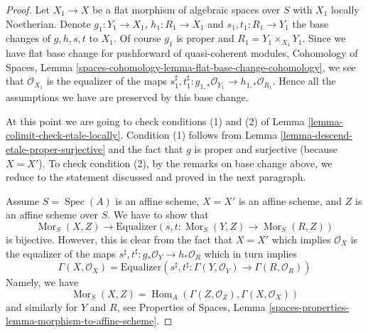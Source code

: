 \documentclass[10pt,a4paper]{amsart}
\theoremstyle{plain}
\theoremstyle{definition}
\theoremstyle{remark}
\numberwithin{equation}{subsection}
\def\Spec{\mathop{\mathrm{Spec}}}
\def\Hom{\mathop{\mathrm{Hom}}\nolimits}
\def\Mor{\mathop{\mathrm{Mor}}\nolimits}
\begin{document}
\begin{proof}
\medskip\noindent
Let $X_1 \to X$ be a flat morphism of algebraic spaces over $S$ with $X_1$
locally Noetherian. Denote $g_1 : Y_1 \to X_1$, $h_1 : R_1 \to X_1$ and
$s_1, t_1 : R_1 \to Y_1$ the base changes of $g, h, s, t$ to $X_1$.
Of course $g_1$ is proper and $R_1 = Y_1 \times_{X_1} Y_1$.
Since we have flat base change for pushforward of quasi-coherent modules,
Cohomology of Spaces, Lemma
\ref{spaces-cohomology-lemma-flat-base-change-cohomology}, we see that
$\mathcal{O}_{X_1}$ is the equalizer of the maps
$s_1^\sharp, t_1^\sharp : g_{1, *}\mathcal{O}_{Y_1} \to
h_{1, *}\mathcal{O}_{R_1}$. Hence all the assumptions we have
are preserved by this base change.

\medskip\noindent
At this point we are going to check conditions (1) and (2) of
Lemma \ref{lemma-colimit-check-etale-locally}. Condition (1)
follows from Lemma \ref{lemma-descend-etale-proper-surjective}
and the fact that $g$ is proper and surjective (because $X = X'$).
To check condition (2), by the remarks on base change above,
we reduce to the statement discussed and proved in the next paragraph.

\medskip\noindent
Assume $S = \Spec(A)$ is an affine scheme, $X = X'$ is an affine scheme, and
$Z$ is an affine scheme over $S$. We have to show that
$$
\Mor_S(X, Z) \longrightarrow
\text{Equalizer}(s, t : \Mor_S(Y, Z) \to \Mor_S(R, Z))
$$
is bijective. However, this is clear from the fact that $X = X'$
which implies $\mathcal{O}_X$ is the equalizer of the maps
$s^\sharp, t^\sharp : g_*\mathcal{O}_Y \to h_*\mathcal{O}_R$
which in turn implies
$$
\Gamma(X, \mathcal{O}_X) =
\text{Equalizer}\left(
s^\sharp, t^\sharp : \Gamma(Y, \mathcal{O}_Y) \to
\Gamma(R, \mathcal{O}_R)
\right)
$$
Namely, we have
$$
\Mor_S(X, Z) = \Hom_A(\Gamma(Z, \mathcal{O}_Z), \Gamma(X, \mathcal{O}_X))
$$
and similarly for $Y$ and $R$, see Properties of Spaces, Lemma
\ref{spaces-properties-lemma-morphism-to-affine-scheme}.
\end{proof}
\end{document}
